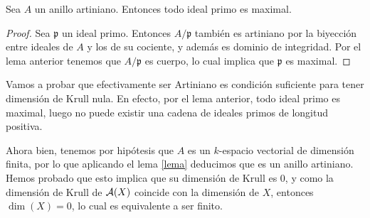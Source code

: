 \documentclass[twoside]{article}
\begin{document}
\begin{solucion}
\begin{lemma}
Sea $A$ un anillo artiniano. Entonces todo ideal primo es maximal.
\end{lemma}
\begin{proof}
Sea $\mathfrak{p}$ un ideal primo. Entonces $A/\mathfrak{p}$ también es artiniano por la biyección entre ideales de $A$ y los de su cociente, y además es dominio de integridad. Por el lema anterior tenemos que $A/\mathfrak{p}$ es cuerpo, lo cual implica que $\mathfrak{p}$ es maximal.
\end{proof}

Vamos a probar que efectivamente ser Artiniano es condición suficiente para tener dimensión de Krull nula. En efecto, por el lema anterior, todo ideal primo es maximal, luego no puede existir una cadena de ideales primos de longitud positiva. 

Ahora bien, tenemos por hipótesis que $A$ es un $k$-espacio vectorial de dimensión finita, por lo que aplicando el lema \ref{lema} deducimos que es un anillo artiniano. Hemos probado que esto implica que su dimensión de Krull es 0, y como la dimensión de Krull de $\mathcal{A}(X)$ coincide con la dimensión de $X$, entonces $\dim(X)=0$, lo cual es equivalente a ser finito.
\end{solucion}

\newpage
\end{document}
